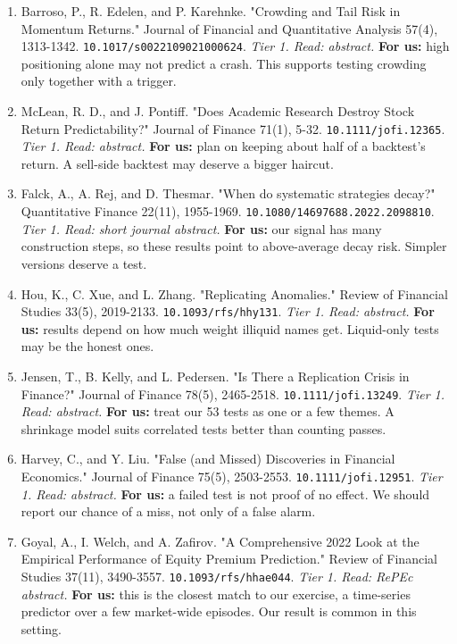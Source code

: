 \begin{enumerate}[leftmargin=*,itemsep=3pt]
\item Barroso, P., R. Edelen, and P. Karehnke. "Crowding and Tail Risk in Momentum Returns." Journal of Financial and Quantitative Analysis 57(4), 1313-1342. \nolinkurl{10.1017/s0022109021000624}. \emph{Tier 1. Read: abstract.} \textbf{For us:} high positioning alone may not predict a crash. This supports testing crowding only together with a trigger.
\item McLean, R. D., and J. Pontiff. "Does Academic Research Destroy Stock Return Predictability?" Journal of Finance 71(1), 5-32. \nolinkurl{10.1111/jofi.12365}. \emph{Tier 1. Read: abstract.} \textbf{For us:} plan on keeping about half of a backtest's return. A sell-side backtest may deserve a bigger haircut.
\item Falck, A., A. Rej, and D. Thesmar. "When do systematic strategies decay?" Quantitative Finance 22(11), 1955-1969. \nolinkurl{10.1080/14697688.2022.2098810}. \emph{Tier 1. Read: short journal abstract.} \textbf{For us:} our signal has many construction steps, so these results point to above-average decay risk. Simpler versions deserve a test.
\item Hou, K., C. Xue, and L. Zhang. "Replicating Anomalies." Review of Financial Studies 33(5), 2019-2133. \nolinkurl{10.1093/rfs/hhy131}. \emph{Tier 1. Read: abstract.} \textbf{For us:} results depend on how much weight illiquid names get. Liquid-only tests may be the honest ones.
\item Jensen, T., B. Kelly, and L. Pedersen. "Is There a Replication Crisis in Finance?" Journal of Finance 78(5), 2465-2518. \nolinkurl{10.1111/jofi.13249}. \emph{Tier 1. Read: abstract.} \textbf{For us:} treat our 53 tests as one or a few themes. A shrinkage model suits correlated tests better than counting passes.
\item Harvey, C., and Y. Liu. "False (and Missed) Discoveries in Financial Economics." Journal of Finance 75(5), 2503-2553. \nolinkurl{10.1111/jofi.12951}. \emph{Tier 1. Read: abstract.} \textbf{For us:} a failed test is not proof of no effect. We should report our chance of a miss, not only of a false alarm.
\item Goyal, A., I. Welch, and A. Zafirov. "A Comprehensive 2022 Look at the Empirical Performance of Equity Premium Prediction." Review of Financial Studies 37(11), 3490-3557. \nolinkurl{10.1093/rfs/hhae044}. \emph{Tier 1. Read: RePEc abstract.} \textbf{For us:} this is the closest match to our exercise, a time-series predictor over a few market-wide episodes. Our result is common in this setting.

\end{enumerate}
